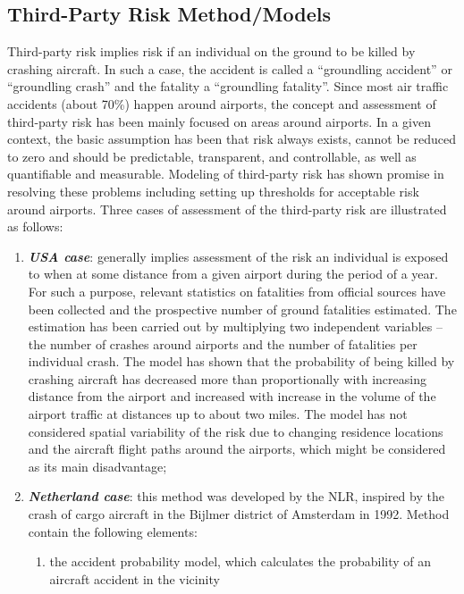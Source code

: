 \documentclass[a4paper, 10pt]{article}
\begin{document}
\begin{enumerate}
\section{Third-Party Risk Method/Models}
Third-party risk implies risk if an individual on the ground
to be killed by crashing aircraft. In such a case, the accident is
called a “groundling accident” or “groundling crash” and the
fatality a “groundling fatality”. Since most air traffic accidents
(about 70\%) happen around airports, the
concept and assessment of third-party risk has been mainly
focused on areas around airports. In a given context, the basic
assumption has been that risk always exists, cannot be reduced
to zero and should be predictable, transparent, and controllable,
as well as quantifiable and measurable. Modeling of third-party
risk has shown promise in resolving these problems including
setting up thresholds for acceptable risk around airports. Three cases of assessment of the third-party risk are
illustrated as follows:
\begin{enumerate}
		\item \textit{\textbf{USA case}}:  generally implies assessment of the risk
				an individual is exposed to when at some distance from a given
				airport during the period of a year. For such a purpose, relevant
				statistics on fatalities from official sources have been collected
				and the prospective number of ground fatalities estimated. The
				estimation has been carried out by multiplying two independent
				variables – the number of crashes around airports and the
				number of fatalities per individual crash. The model has shown
				that the probability of being killed by crashing aircraft has
				decreased more than proportionally with increasing distance
				from the airport and increased with increase in the volume of
				the airport traffic at distances up to about two miles. The model
				has not considered spatial variability of the risk due to
				changing residence locations and the aircraft flight paths
				around the airports, which might be considered as its main
				disadvantage;
		\item \textit{\textbf{Netherland case}}: this method was developed by
				the NLR, inspired by the crash of cargo aircraft in the Bijlmer
				district of Amsterdam in 1992. Method contain the following
				elements:
				\begin{enumerate}
						\item the accident probability model, which
				calculates the probability of an aircraft accident in the vicinity

\end{enumerate}
\end{enumerate}
\end{enumerate}
\end{document}
